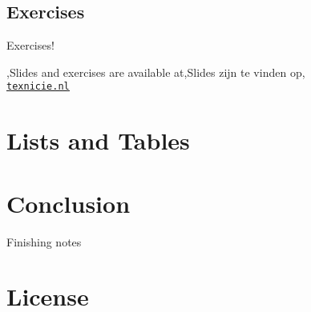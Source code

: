 \documentclass[
    english,
    everyoneauthor=true,
    aes,
    defaultSlideCollection=vincent,
]{../../cursuspresentatie}
\begin{document}
\subsection{Exercises}
\def\placetarget{\hypertarget{exercises2}{}}

\begin{frame}
    \begin{center}
        {\LARGE Exercises!}
        \vspace{30pt}

        {\Large\lang,Slides and exercises are available at,Slides zijn te vinden op,\\
         \href{https://texnicie.nl}{\ul{\texttt{texnicie.nl}}}}
    \end{center}
\end{frame}


\section{Lists and Tables}
\def\placetarget{\hypertarget{tables}{}}

\begin{nologo}
\end{nologo}

\section{Conclusion}
\def\placetarget{\hypertarget{finishingnotes}{}}

\begin{frame}
    Finishing notes
\end{frame}


\section{License}
    
\end{document}
